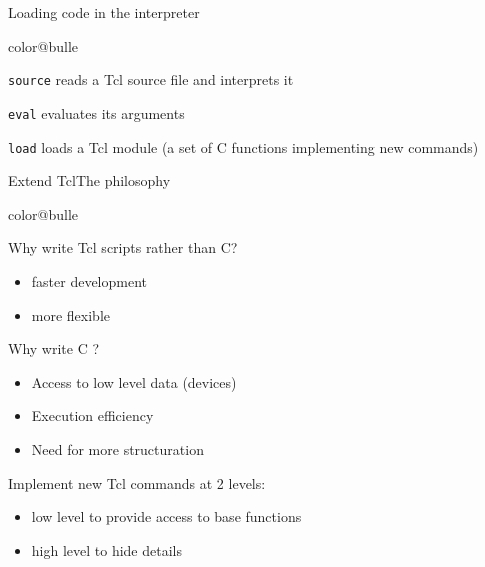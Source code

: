 \documentclass[a4paper,landscape,smooth]{show}
\begin{document}

\begin{tslide}{Loading code in the interpreter}
   \vfill
   \begin{bitemize}{color@bulle}
      \item \texttt{source} reads a Tcl source file and interprets it
      \item \texttt{eval} evaluates its arguments
      \item \texttt{load} loads a Tcl module (a set of C functions
	 implementing new commands)
   \end{bitemize}
   \vfill
\end{tslide}


\begin{part}{Extend Tcl}{The philosophy}
   \vfill
   \begin{bitemize}{color@bulle}
      \item Why write Tcl scripts rather than C?
         \begin{itemize}
	    \item faster development
	    \item more flexible
         \end{itemize}

      \item Why write C ?
	 \begin{itemize}
	    \item Access to low level data (devices)
	    \item Execution efficiency
	    \item Need for more structuration
	 \end{itemize}

      \item Implement new Tcl commands at 2 levels:
	 \begin{itemize}
	    \item low level to provide access to base functions
	    \item high level to hide details
	 \end{itemize}

   \end{bitemize}
   \vfill
\end{part}

\end{document}
